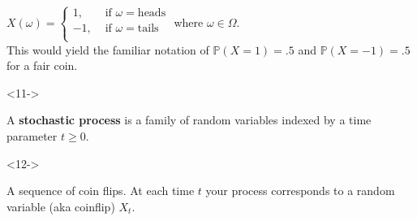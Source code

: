\documentclass[10pt]{beamer}
\begin{document}
\begin{frame}[t]
\begin{onlyenv}
\begin{example}
      \vskip 5pt
      $X(\omega) = \begin{cases}
        1, &\text{ if }\omega = \text{heads}\\
        -1, &\text{ if }\omega = \text{tails}\\
      \end{cases}$ where $\omega \in \Omega$. \\
      \vskip 5pt
      This would yield the familiar notation of $\mathbb{P}(X = 1) = .5$ and $\mathbb{P}(X = -1) = .5$ for a fair coin.
    \end{example} 
    \end{onlyenv}
    \begin{onlyenv}<11->
      \begin{definition}
        A \textbf{stochastic process} is a family of random variables indexed by a time parameter $t \geq 0$.
      \end{definition}
    \end{onlyenv}
    \begin{onlyenv}<12->
      \begin{example}
        A sequence of coin flips. At each time $t$ your process corresponds to a random variable (aka coinflip) $X_t$.
      \end{example}
    \end{onlyenv}
\end{frame}
\end{document}

